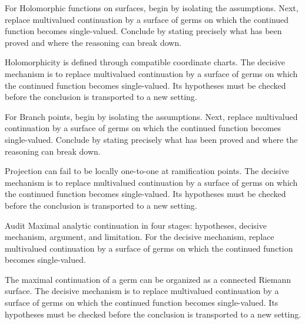 \begin{problem}\label{prob:iv22-problem-06}
For Holomorphic functions on surfaces, begin by isolating the assumptions. Next, replace multivalued continuation by a surface of germs on which the continued function becomes single-valued. Conclude by stating precisely what has been proved and where the reasoning can break down.
\end{problem}
\begin{solution}
Holomorphicity is defined through compatible coordinate charts. The decisive mechanism is to replace multivalued continuation by a surface of germs on which the continued function becomes single-valued. Its hypotheses must be checked before the conclusion is transported to a new setting.
\end{solution}

\begin{problem}\label{prob:iv22-problem-07}
For Branch points, begin by isolating the assumptions. Next, replace multivalued continuation by a surface of germs on which the continued function becomes single-valued. Conclude by stating precisely what has been proved and where the reasoning can break down.
\end{problem}
\begin{solution}
Projection can fail to be locally one-to-one at ramification points. The decisive mechanism is to replace multivalued continuation by a surface of germs on which the continued function becomes single-valued. Its hypotheses must be checked before the conclusion is transported to a new setting.
\end{solution}

\begin{problem}\label{prob:iv22-problem-08}
Audit Maximal analytic continuation in four stages: hypotheses, decisive mechanism, argument, and limitation. For the decisive mechanism, replace multivalued continuation by a surface of germs on which the continued function becomes single-valued.
\end{problem}
\begin{solution}
The maximal continuation of a germ can be organized as a connected Riemann surface. The decisive mechanism is to replace multivalued continuation by a surface of germs on which the continued function becomes single-valued. Its hypotheses must be checked before the conclusion is transported to a new setting.
\end{solution}

